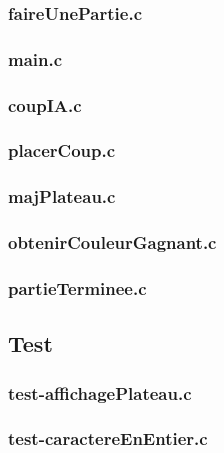 \subsubsection{faireUnePartie.c}

\vline

\subsubsection{main.c}

\vline

\subsubsection{coupIA.c}

\vline

\subsubsection{placerCoup.c}

\vline

\subsubsection{majPlateau.c}

\vline

\subsubsection{obtenirCouleurGagnant.c}

\vline

\subsubsection{partieTerminee.c}

\vline


\subsection{Test}

\subsubsection{test-affichagePlateau.c}

\vline

\subsubsection{test-caractereEnEntier.c}

\vline

